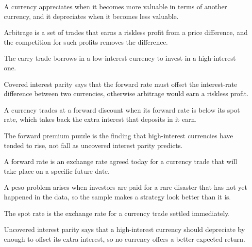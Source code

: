 \begin{keyterms}
\small
\begin{description}[leftmargin=0pt, itemsep=2pt, parsep=0pt, font=\normalfont\bfseries\color{FEMaroon}]
  \item[Appreciation.] A currency appreciates when it becomes more valuable in terms of another currency, and it depreciates when it becomes less valuable.
  \item[Arbitrage.] Arbitrage is a set of trades that earns a riskless profit from a price difference, and the competition for such profits removes the difference.
  \item[Carry trade.] The carry trade borrows in a low-interest currency to invest in a high-interest one.
  \item[Covered interest parity.] Covered interest parity says that the forward rate must offset the interest-rate difference between two currencies, otherwise arbitrage would earn a riskless profit.
  \item[Forward discount.] A currency trades at a forward discount when its forward rate is below its spot rate, which takes back the extra interest that deposits in it earn.
  \item[Forward premium puzzle.] The forward premium puzzle is the finding that high-interest currencies have tended to rise, not fall as uncovered interest parity predicts.
  \item[Forward rate.] A forward rate is an exchange rate agreed today for a currency trade that will take place on a specific future date.
  \item[Peso problem.] A peso problem arises when investors are paid for a rare disaster that has not yet happened in the data, so the sample makes a strategy look better than it is.
  \item[Spot rate.] The spot rate is the exchange rate for a currency trade settled immediately.
  \item[Uncovered interest parity.] Uncovered interest parity says that a high-interest currency should depreciate by enough to offset its extra interest, so no currency offers a better expected return.
\end{description}
\end{keyterms}
